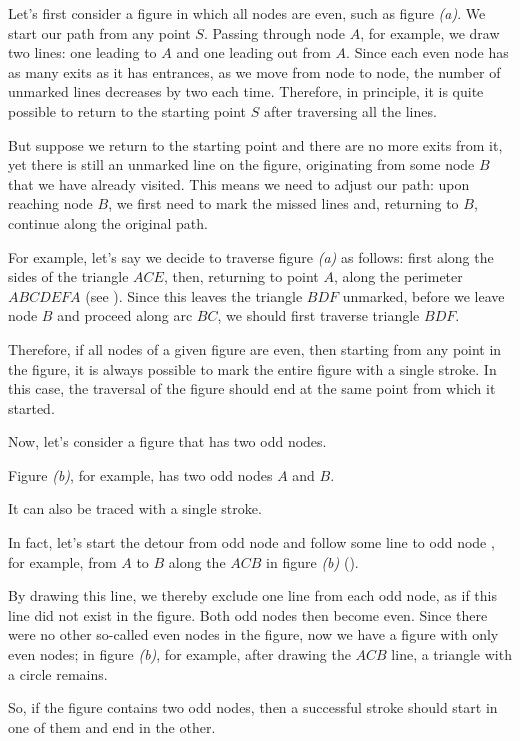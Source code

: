 Let's first consider a figure in which all nodes are even, such as figure \emph{(a)}. We start our path from any point $S$. Passing through node $A$, for example, we draw two lines: one leading to $A$ and one leading out from $A$. Since each even node has as many exits as it has entrances, as we move from node to node, the number of unmarked lines decreases by two each time. Therefore, in principle, it is quite possible to return to the starting point $S$ after traversing all the lines.

But suppose we return to the starting point and there are no more exits from it, yet there is still an unmarked line on the figure, originating from some node $B$ that we have already visited. This means we need to adjust our path: upon reaching node $B$, we first need to mark the missed lines and, returning to $B$, continue along the original path.

For example, let's say we decide to traverse figure \emph{(a)} as follows: first along the sides of the triangle $ACE$, then, returning to point $A$, along the perimeter $ABCDEFA$ (see ). Since this leaves the triangle $BDF$ unmarked, before we leave node $B$ and proceed along arc $BC$, we should first traverse triangle $BDF$.

Therefore, if all nodes of a given figure are even, then starting from any point in the figure, it is always possible to mark the entire figure with a single stroke. In this case, the traversal of the figure should end at the same point from which it started.

Now, let's consider a figure that has two odd nodes.

Figure \emph{(b)}, for example, has two odd nodes $A$ and $B$.

It can also be traced with a single stroke.


In fact, let's start the detour from odd node  and follow some line to odd node , for example, from $A$ to $B$ along the $ACB$ in figure \emph{(b)} ().

By drawing this line, we thereby exclude one line from each odd node, as if this line did not exist in the figure. Both odd nodes then become even. Since there were no other so-called even nodes in the figure, now we have a figure with only even nodes; in figure \emph{(b)}, for example, after drawing the $ACB$ line, a triangle with a circle remains.

So, if the figure contains two odd nodes, then a successful stroke should start in one of them and end in the other.


